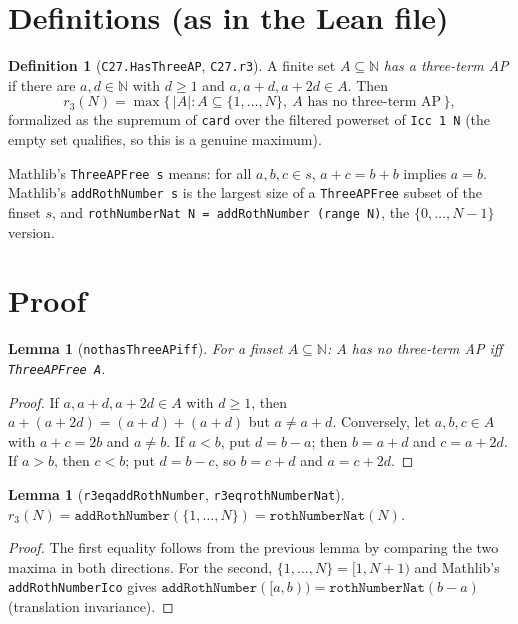 \documentclass[11pt]{article}
\newtheorem{lemma}[theorem]{Lemma}
\theoremstyle{definition}
\newtheorem{definition}[theorem]{Definition}
\theoremstyle{remark}
\renewcommand{\_}{\oldus\allowbreak}
\begin{document}
\section{Definitions (as in the Lean file)}

\begin{definition}[\texttt{C27.HasThreeAP}, \texttt{C27.r3}]
A finite set $A\subseteq\mathbb N$ \emph{has a three-term AP} if there are $a, d \in \mathbb N$ with
$d \ge 1$ and $a, a+d, a+2d \in A$. Then
\[ r_3(N) = \max\{\, |A| : A \subseteq \{1,\dots,N\},\ A \text{ has no three-term AP} \,\}, \]
formalized as the supremum of \texttt{card} over the filtered powerset of \texttt{Icc 1 N} (the empty set
qualifies, so this is a genuine maximum).
\end{definition}

Mathlib's \texttt{ThreeAPFree s} means: for all $a,b,c\in s$, $a + c = b + b$ implies $a = b$.
Mathlib's \texttt{addRothNumber s} is the largest size of a \texttt{ThreeAPFree} subset of the finset $s$,
and \texttt{rothNumberNat N = addRothNumber (range N)}, the $\{0,\dots,N-1\}$ version.

\section{Proof}

\begin{lemma}[\texttt{not\_hasThreeAP\_iff}]
For a finset $A\subseteq\mathbb N$: $A$ has no three-term AP iff \texttt{ThreeAPFree A}.
\end{lemma}
\begin{proof}
If $a,a+d,a+2d\in A$ with $d\ge1$, then $a + (a+2d) = (a+d)+(a+d)$ but $a \ne a+d$. Conversely, let
$a,b,c\in A$ with $a+c = 2b$ and $a\ne b$. If $a<b$, put $d = b-a$; then $b = a+d$ and $c = a+2d$. If
$a > b$, then $c < b$; put $d = b - c$, so $b = c+d$ and $a = c + 2d$.
\end{proof}

\begin{lemma}[\texttt{r3\_eq\_addRothNumber}, \texttt{r3\_eq\_rothNumberNat}]
$r_3(N) = \texttt{addRothNumber}(\{1,\dots,N\}) = \texttt{rothNumberNat}(N)$.
\end{lemma}
\begin{proof}
The first equality follows from the previous lemma by comparing the two maxima in both directions. For
the second, $\{1,\dots,N\} = [1, N+1)$ and Mathlib's \texttt{addRothNumber\_Ico} gives
$\texttt{addRothNumber}([a,b)) = \texttt{rothNumberNat}(b-a)$ (translation invariance).
\end{proof}
\end{document}
